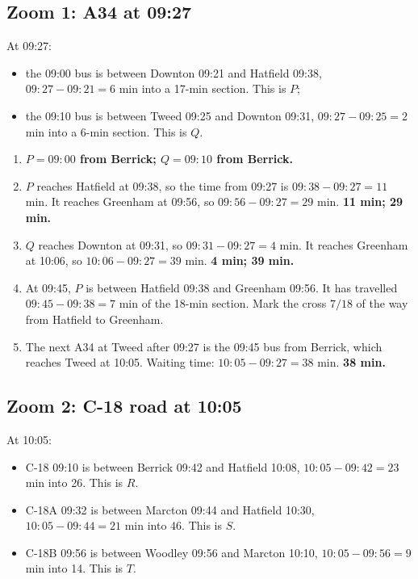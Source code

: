 \documentclass[11pt,a4paper]{article}
\newcommand{\ans}[1]{\textcolor{red!75!black}{\textbf{#1}}}
\begin{document}
\subsection*{Zoom 1: A34 at 09:27}
At 09:27:
\begin{itemize}
\item the 09:00 bus is between Downton 09:21 and Hatfield 09:38, \(09{:}27-09{:}21=6\) min into a 17-min section. This is \(P\);
\item the 09:10 bus is between Tweed 09:25 and Downton 09:31, \(09{:}27-09{:}25=2\) min into a 6-min section. This is \(Q\).
\end{itemize}

\begin{enumerate}[label=\textbf{\alph*)},leftmargin=*]
\item \ans{\(P=09{:}00\) from Berrick; \(Q=09{:}10\) from Berrick.}
\item \(P\) reaches Hatfield at 09:38, so the time from 09:27 is \(09{:}38-09{:}27=11\) min. It reaches Greenham at 09:56, so \(09{:}56-09{:}27=29\) min. \ans{11 min; 29 min.}
\item \(Q\) reaches Downton at 09:31, so \(09{:}31-09{:}27=4\) min. It reaches Greenham at 10:06, so \(10{:}06-09{:}27=39\) min. \ans{4 min; 39 min.}
\item At 09:45, \(P\) is between Hatfield 09:38 and Greenham 09:56. It has travelled \(09{:}45-09{:}38=7\) min of the 18-min section. Mark the cross \(7/18\) of the way from Hatfield to Greenham.
\item The next A34 at Tweed after 09:27 is the 09:45 bus from Berrick, which reaches Tweed at 10:05. Waiting time: \(10{:}05-09{:}27=38\) min. \ans{38 min.}
\end{enumerate}

\subsection*{Zoom 2: C-18 road at 10:05}
At 10:05:
\begin{itemize}
\item C-18 09:10 is between Berrick 09:42 and Hatfield 10:08, \(10{:}05-09{:}42=23\) min into 26. This is \(R\).
\item C-18A 09:32 is between Marcton 09:44 and Hatfield 10:30, \(10{:}05-09{:}44=21\) min into 46. This is \(S\).
\item C-18B 09:56 is between Woodley 09:56 and Marcton 10:10, \(10{:}05-09{:}56=9\) min into 14. This is \(T\).
\end{itemize}
\end{document}
